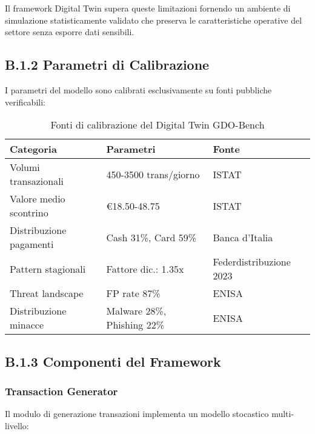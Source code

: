 Il framework Digital Twin supera queste limitazioni fornendo un ambiente di simulazione statisticamente validato che preserva le caratteristiche operative del settore senza esporre dati sensibili.

\subsection{B.1.2 Parametri di Calibrazione}

I parametri del modello sono calibrati esclusivamente su fonti pubbliche verificabili:

\begin{table}[h]
\centering
\caption{Fonti di calibrazione del Digital Twin GDO-Bench}
\label{tab:calibration-sources}
\begin{tabular}{@{}lll@{}}
\toprule
\textbf{Categoria} & \textbf{Parametri} & \textbf{Fonte} \\
\midrule
Volumi transazionali & 450-3500 trans/giorno & ISTAT\autocite{istat2023} \\
Valore medio scontrino & €18.50-48.75 & ISTAT\autocite{istat2023} \\
Distribuzione pagamenti & Cash 31\%, Card 59\% & Banca d'Italia\autocite{bancaditalia2023} \\
Pattern stagionali & Fattore dic.: 1.35x & Federdistribuzione 2023 \\
Threat landscape & FP rate 87\% & ENISA\autocite{enisa2023} \\
Distribuzione minacce & Malware 28\%, Phishing 22\% & ENISA\autocite{enisa2023} \\
\bottomrule
\end{tabular}
\end{table}

\subsection{B.1.3 Componenti del Framework}

\subsubsection{Transaction Generator}

Il modulo di generazione transazioni implementa un modello stocastico multi-livello:

